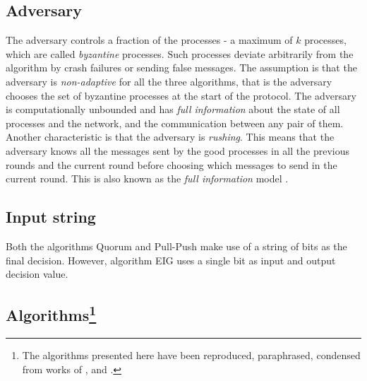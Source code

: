 \subsection{Adversary}
The adversary controls a fraction of the processes - a maximum of $k$ processes, which are called \textit{byzantine} processes. Such processes deviate arbitrarily from the algorithm by crash failures or sending false messages. The assumption is that the adversary is \textit{non-adaptive} for all the three algorithms, that is the adversary chooses the set of byzantine processes at the start of the protocol. The adversary is computationally unbounded and has \textit{full information} about the state of all processes and the network, and the communication between any pair of them. Another characteristic is that the adversary is \textit{rushing}. This means that the adversary knows all the messages sent by the good processes in all the previous rounds and the current round before choosing which messages to send in the current round. This is also known as the \textit{full information} model \cite{GGL98}.

\subsection{Input string}
Both the algorithms Quorum and Pull-Push  make use of a string of bits as the final decision. However, algorithm EIG uses a single bit as input and output decision value.


\subsection{Algorithms\protect\footnote{The algorithms presented here have been reproduced, paraphrased, condensed from works of \cite{BPV06}, \cite{KM13} and \cite{BGH13}.}}

